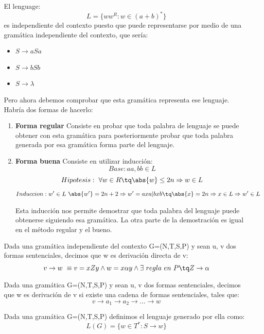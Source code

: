 \documentclass{apuntes}
\begin{document}
\begin{example}
El lenguage:
\[L = \lbrace ww^R : w \in (a+b)^*\rbrace\]
es independiente del contexto puesto que puede representarse por medio de una gramática independiente del contexto, que sería:
\begin{itemize}
\item $S \rightarrow aSa$
\item $S \rightarrow bSb$
\item $S \rightarrow \lambda$
\end{itemize}

Pero ahora debemos comprobar que esta gramática representa ese lenguaje. Habría dos formas de hacerlo: 
\begin{enumerate}
\item \textbf{Forma regular}
Consiste en probar que toda palabra de lenguaje se puede obtener con esta gramática para posteriormente probar que toda palabra generada por esa gramática forma parte del lenguaje.

\item \textbf{Forma buena}
Consiste en utilizar inducción:
\[Base: aa, bb \in L\]
\[Hipotesis:\ \forall w \in R \tq \abs{w} \leq 2n \Rightarrow w \in L\]
\[Induccion: w'\in L \ \abs{w'} = 2n+2 \Rightarrow w' = axa | bxb \tq \abs{x} = 2n \Rightarrow x \in L \Rightarrow w' \in L\]

Esta inducción nos permite demostrar que toda palabra del lenguaje puede obtenerse siguiendo esa gramática. La otra parte de la demostración es igual en el método regular y el bueno.
\end{enumerate}
\end{example}

\begin{defn}
Dada una gramática independiente del contexto G=(N,T,S,P) y sean u, v dos formas sentenciales, decimos que w es derivación directa de v:
\[v \rightarrow w\ \equiv v=xZy \wedge w=x\alpha y \wedge \exists \ regla \ en \ P \tq Z \rightarrow \alpha\]
\end{defn}

\begin{defn}[Derivación]
Dada una gramática G=(N,T,S,P) y sean u, v dos formas sentenciales, decimos que w es derivación de v si existe una cadena de formas sentenciales, tales que:
\[v \rightarrow a_1 \rightarrow a_2 \rightarrow ... \rightarrow w\]
\end{defn}

\begin{defn}
Dada una gramática G=(N,T,S,P) definimos el lenguaje generado por ella como:
\[L(G) = \lbrace w \in T^*: S \rightarrow w \rbrace\]
\end{defn}
\end{document}
